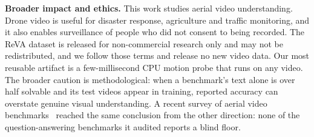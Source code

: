 \textbf{Broader impact and ethics.} This work studies aerial video
understanding. Drone video is useful for disaster
response, agriculture and traffic monitoring, and it also enables surveillance of
people who did not consent to being recorded. The ReVA dataset is released
for non-commercial research only and may not be redistributed, and we follow
those terms and release no new video data. Our most reusable artifact is a
few-millisecond CPU motion probe that runs on any video. The broader
caution is methodological: when a benchmark's text alone is over half
solvable and its test videos appear in training, reported accuracy can
overstate genuine visual understanding. A recent survey of aerial video
benchmarks~\cite{angelidis2026aerialgap} reached the same conclusion from
the other direction: none of the question-answering benchmarks it audited
reports a blind floor.

